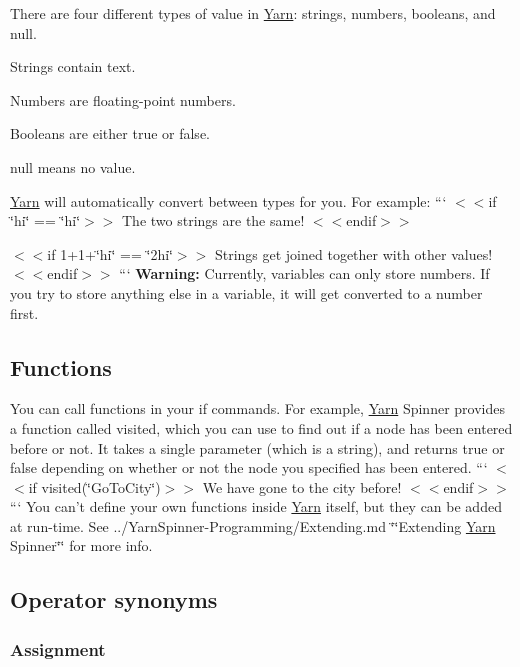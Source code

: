 There are four different types of value in \hyperlink{a00045}{Yarn}\-: strings, numbers, booleans, and {\ttfamily null}.


\begin{DoxyItemize}
\item Strings contain text.
\item Numbers are floating-\/point numbers.
\item Booleans are either true or false.
\item {\ttfamily null} means no value.
\end{DoxyItemize}

\hyperlink{a00045}{Yarn} will automatically convert between types for you. For example\-: ``` $<$$<$if \char`\"{}hi\char`\"{} == \char`\"{}hi\char`\"{}$>$$>$ The two strings are the same! $<$$<$endif$>$$>$

$<$$<$if 1+1+\char`\"{}hi\char`\"{} == \char`\"{}2hi\char`\"{}$>$$>$ Strings get joined together with other values! $<$$<$endif$>$$>$ ``` {\bfseries Warning\-:} Currently, variables can only store numbers. If you try to store anything else in a variable, it will get converted to a number first.

\subsection*{Functions}

You can call functions in your {\ttfamily if} commands. For example, \hyperlink{a00045}{Yarn} Spinner provides a function called {\ttfamily visited}, which you can use to find out if a node has been entered before or not. It takes a single parameter (which is a string), and returns true or false depending on whether or not the node you specified has been entered. ``` $<$$<$if visited(\char`\"{}\-Go\-To\-City\char`\"{})$>$$>$ We have gone to the city before! $<$$<$endif$>$$>$ ``` You can't define your own functions inside \hyperlink{a00045}{Yarn} itself, but they can be added at run-\/time. See ../\-Yarn\-Spinner-\/\-Programming/\-Extending.md \char`\"{}\char`\"{}Extending \hyperlink{a00045}{Yarn} Spinner\char`\"{}\char`\"{} for more info.

\subsection*{Operator synonyms}

\subsubsection*{Assignment}

